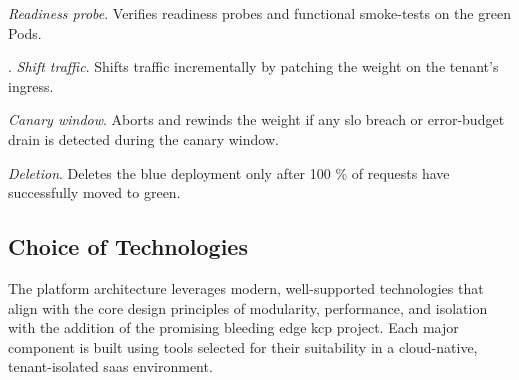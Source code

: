 \documentclass[11pt, a4paper, oneside, listof=totoc]{scrartcl}
\begin{document}
                    \begin{enumerate}[label={[\arabic*]:},
                        ref=Challenge~\arabic*,
                        leftmargin=*,
                        itemsep=0.6\baselineskip]

                        \item\label{chal:readinessProbe}
                            \textit{Readiness probe}.
                            Verifies readiness probes and functional smoke-tests on the green Pods.

                        \item\label{chal:shiftTraffic}.
                            \textit{Shift traffic}.
                            Shifts traffic incrementally by patching the weight on the tenant's
                            \gls{ingress}.

                        \item\label{chal:canaryWindow}
                            \textit{Canary window}.
                            Aborts and rewinds the weight if any \gls{slo} breach or error-budget
                            drain is detected during the canary window.
                        
                        \item\label{chal:deletion}
                            \textit{Deletion}.
                            Deletes the blue deployment only after 100 \% of requests have
                            successfully moved to green.

                    \end{enumerate}

            \clearpage

        \subsection{Choice of Technologies}\label{subsec:technologies}
            The platform architecture leverages modern, well-supported technologies that align with
            the core design principles of modularity, performance, and isolation with the addition
            of the promising bleeding edge \gls{kcp} project.
            Each major component is built using tools selected for their suitability in a
            cloud-native, tenant-isolated \gls{saas} environment.
\end{document}

